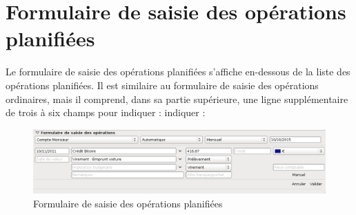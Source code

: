 \section{Formulaire de saisie des opérations planifiées\label{plannedtransactions-form}}


Le formulaire de saisie des opérations planifiées s'affiche en-dessous de la liste des opérations planifiées. Il est similaire au formulaire de saisie des opérations ordinaires, mais il comprend, dans sa partie supérieure, une ligne supplémentaire de trois à six champs pour \ifIllustration indiquer :
\else indiquer :
\fi

\ifIllustration
\begin{figure}[htbp]
\begin{center}
\includegraphics[scale=0.5]{image/screenshot/planned_transactions_form}
\end{center}
\caption{Formulaire de saisie des opérations planifiées}
\label{planned-transactions-form-img}
\end{figure}
\fi

